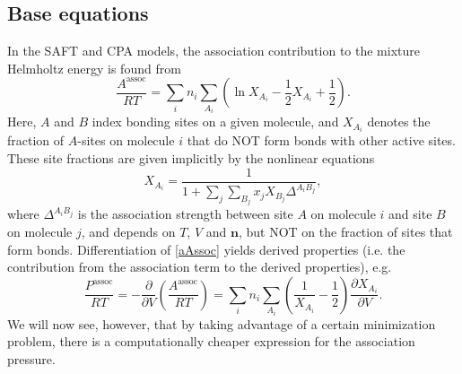 \documentclass[english]{../thermomemo/thermomemo}
\newcommand{\mbf}[0]{\mathbf}
\newcommand{\lp}{\left(}
\newcommand{\rp}{\right)}
\begin{document}
\subsection{Base equations}
In the SAFT and CPA models, the association contribution to the mixture Helmholtz energy is found from
\begin{equation}
  \label{aAssoc}
  \frac{A^{\text{assoc}}}{RT} = \sum_i n_i \sum_{A_i} \lp \ln X_{A_i} - \frac12 X_{A_i} + \frac12 \rp.
\end{equation}
Here, $A$ and $B$ index bonding sites on a given molecule, and $X_{A_i}$ denotes the fraction of $A$-sites on molecule $i$ that do NOT form bonds with other active sites. These site fractions are given implicitly by the nonlinear equations
\begin{equation}
  X_{A_i} = \frac{1}{1 + \sum_j \sum_{B_j} x_j X_{B_j} \Delta^{A_i B_j}},
\end{equation}
where $\Delta^{A_i B_j}$ is the association strength between site $A$ on molecule $i$ and site $B$ on molecule $j$, and depends on $T$, $V$ and $\mbf n$, but NOT on the fraction of sites that form bonds. Differentiation of \eqref{aAssoc} yields derived properties (i.e. the contribution from the association term to the derived properties), e.g.
\begin{equation}
  \frac{P^{\text{assoc}}}{RT} = -\frac{\partial}{\partial V} \lp \frac{A^{\text{assoc}}}{RT} \rp = \sum_i n_i \sum_{A_i} \lp \frac{1}{X_{A_i}}-\frac{1}{2} \rp \frac{\partial X_{A_i}}{\partial V}.
\end{equation}
We will now see, however, that by taking advantage of a certain minimization problem, there is a computationally cheaper expression for the association pressure.
\end{document}
